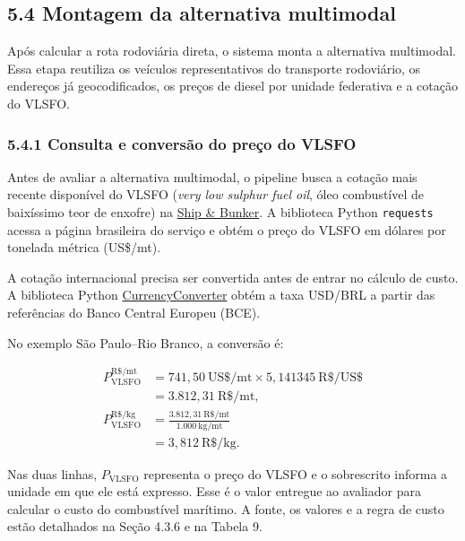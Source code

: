 \documentclass[brazil,]{article}
\let\oldsubsection\subsection
\renewcommand{\subsection}{\Needspace{12\baselineskip}\oldsubsection}
\let\oldsubsubsection\subsubsection
\renewcommand{\subsubsection}{\Needspace{10\baselineskip}\oldsubsubsection}
\begin{document}
\hypertarget{montagem-da-alternativa-multimodal}{%
\subsection{5.4 Montagem da alternativa
multimodal}\label{montagem-da-alternativa-multimodal}}

Após calcular a rota rodoviária direta, o sistema monta a alternativa
multimodal. Essa etapa reutiliza os veículos representativos do
transporte rodoviário, os endereços já geocodificados, os preços de
diesel por unidade federativa e a cotação do VLSFO.

\hypertarget{consulta-e-conversuxe3o-do-preuxe7o-do-vlsfo}{%
\subsubsection{5.4.1 Consulta e conversão do preço do
VLSFO}\label{consulta-e-conversuxe3o-do-preuxe7o-do-vlsfo}}

Antes de avaliar a alternativa multimodal, o pipeline busca a cotação
mais recente disponível do VLSFO (\emph{very low sulphur fuel oil}, óleo
combustível de baixíssimo teor de enxofre) na
\href{https://shipandbunker.com/prices/br-brazil}{Ship \& Bunker}. A
biblioteca Python \texttt{requests} acessa a página brasileira do
serviço e obtém o preço do VLSFO em dólares por tonelada métrica
(US\$/mt).

A cotação internacional precisa ser convertida antes de entrar no
cálculo de custo. A biblioteca Python
\href{https://pypi.org/project/CurrencyConverter/}{CurrencyConverter}
obtém a taxa USD/BRL a partir das referências do Banco Central Europeu
(BCE).

No exemplo São Paulo--Rio Branco, a conversão é:

\[
\begin{aligned}
P_{\mathrm{VLSFO}}^{\mathrm{R\$/mt}}
&= 741{,}50\ \mathrm{US\$/mt} \times 5{,}141345\ \mathrm{R\$/US\$} \\
&= 3.812{,}31\ \mathrm{R\$/mt}, \\[4pt]
P_{\mathrm{VLSFO}}^{\mathrm{R\$/kg}}
&= \frac{3.812{,}31\ \mathrm{R\$/mt}}{1.000\ \mathrm{kg/mt}} \\
&= 3{,}812\ \mathrm{R\$/kg}.
\end{aligned}
\]

Nas duas linhas, \(P_{\mathrm{VLSFO}}\) representa o preço do VLSFO e o
sobrescrito informa a unidade em que ele está expresso. Esse é o valor
entregue ao avaliador para calcular o custo do combustível marítimo. A
fonte, os valores e a regra de custo estão detalhados na Seção 4.3.6 e
na Tabela 9.
\end{document}

